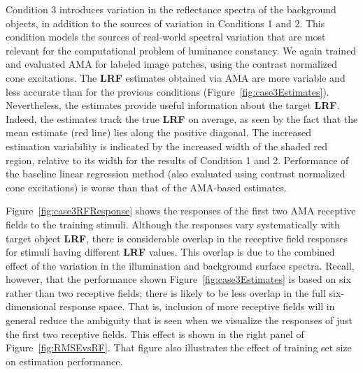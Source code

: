 \documentclass{jov}
\providecommand{\DIFaddtex}[1]{{\bf #1}} %
\providecommand{\DIFdeltex}[1]{} %
\providecommand{\DIFaddbegin}{} %
\providecommand{\DIFaddend}{} %
\providecommand{\DIFdelbegin}{} %
\providecommand{\DIFdelend}{} %
\providecommand{\DIFadd}[1]{\texorpdfstring{\DIFaddtex{#1}}{#1}} %
\providecommand{\DIFdel}[1]{\texorpdfstring{\DIFdeltex{#1}}{}} %
\newcommand{\DIFscaledelfig}{0.5}
\newlength{\DIFdelgraphicswidth} %
\newlength{\DIFdelgraphicsheight} %
\newcommand{\DIFaddincludegraphics}[2][]{{\color{blue}\fbox{\DIFOincludegraphics[#1]{#2}}}} %
\newcommand{\DIFdelincludegraphics}[2][]{%
\sbox{\DIFdelgraphicsbox}{\DIFOincludegraphics[#1]{#2}}%
\settoboxwidth{\DIFdelgraphicswidth}{\DIFdelgraphicsbox} %
\settoboxtotalheight{\DIFdelgraphicsheight}{\DIFdelgraphicsbox} %
\scalebox{\DIFscaledelfig}{%
\parbox[b]{\DIFdelgraphicswidth}{\usebox{\DIFdelgraphicsbox}\\[-\baselineskip] \rule{\DIFdelgraphicswidth}{0em}}\llap{\resizebox{\DIFdelgraphicswidth}{\DIFdelgraphicsheight}{%
\setlength{\unitlength}{\DIFdelgraphicswidth}%
\begin{picture}(1,1)%
\thicklines\linethickness{2pt} %
{\color[rgb]{1,0,0}\put(0,0){\framebox(1,1){}}}%
{\color[rgb]{1,0,0}\put(0,0){\line( 1,1){1}}}%
{\color[rgb]{1,0,0}\put(0,1){\line(1,-1){1}}}%
\end{picture}%
}\hspace*{3pt}}} %
} %
\DeclareRobustCommand{\DIFaddbegin}{\DIFOaddbegin \let\includegraphics\DIFaddincludegraphics} %
\DeclareRobustCommand{\DIFaddend}{\DIFOaddend \let\includegraphics\DIFOincludegraphics} %
\DeclareRobustCommand{\DIFdelbegin}{\DIFOdelbegin \let\includegraphics\DIFdelincludegraphics} %
\DeclareRobustCommand{\DIFdelend}{\DIFOaddend \let\includegraphics\DIFOincludegraphics} %
\begin{document}
Condition 3 introduces variation in the reflectance spectra of the background objects, in addition to the sources of variation in Conditions 1 and 2.
This condition models the sources of real-world spectral variation that are most relevant for the computational problem of luminance constancy.
We again trained and evaluated AMA for labeled image patches, using the contrast normalized cone excitations.
The \DIFdelbegin \DIFdel{LRV }\DIFdelend \DIFaddbegin \DIFadd{LRF }\DIFaddend estimates obtained via AMA are more variable and less accurate than for the previous conditions (Figure~\ref{fig:case3Estimates}).
Nevertheless, the estimates provide useful information about the target \DIFdelbegin \DIFdel{LRV}\DIFdelend \DIFaddbegin \DIFadd{LRF}\DIFaddend .
Indeed, the estimates track the true \DIFdelbegin \DIFdel{LRV }\DIFdelend \DIFaddbegin \DIFadd{LRF }\DIFaddend on average, as seen by the fact that the mean estimate (red line) lies along the positive diagonal.
The increased estimation variability is indicated by the increased width of the shaded red region, relative to its width for the results of Condition 1 and 2.
Performance of the baseline linear regression method (also evaluated using contrast normalized cone excitations) is worse than that of the AMA-based estimates.

Figure~\ref{fig:case3RFResponse} shows the responses of the first two AMA receptive fields to the training stimuli.
Although the responses vary systematically with target object \DIFdelbegin \DIFdel{LRV}\DIFdelend \DIFaddbegin \DIFadd{LRF}\DIFaddend , there is considerable overlap in the receptive field responses for stimuli having different \DIFdelbegin \DIFdel{LRV }\DIFdelend \DIFaddbegin \DIFadd{LRF }\DIFaddend values.
This overlap is due to the combined effect of the variation in the illumination and background surface spectra.
Recall, however, that the performance shown Figure~\ref{fig:case3Estimates} is based on six rather than two receptive fields;
there is likely to be less overlap in the full six-dimensional response space.
That is, inclusion of more receptive fields will in general reduce the ambiguity that is seen when we visualize the responses of just the first two receptive fields.
This effect is shown in the right panel of Figure~\ref{fig:RMSEvsRF}.
That figure also illustrates the effect of training set size on estimation performance. 
\end{document}
